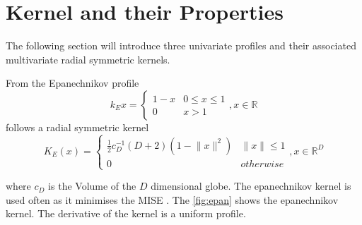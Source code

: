 \section{Kernel and their Properties} %
\label{sec:kernel_properties}
The following section will introduce three univariate profiles and
their associated multivariate radial symmetric kernels.

From the Epanechnikov profile
\begin{equation}\label{eq:epa}
  k_E{x} = \begin{cases}
    1 - x &  0 \leq x \leq 1\\
    0 & x > 1
  \end{cases}, x \in \mathbb{R}
\end{equation}
follows a radial symmetric kernel
\begin{equation}\label{eq:epak}
  K_E(x) = \begin{cases}
    \frac{1}{2}c_D^{-1}(D+2)(1-\lVert x \rVert^2) &  \lVert x \rVert \leq 1 \\
    0 & \mathit{otherwise}
  \end{cases}, x \in \mathbb{R}^D
\end{equation}

where $c_D$ is the Volume of the $D$ dimensional globe. The
epanechnikov kernel is used often as it minimises the \gls{MISE}
\citep{citeulike:5813637}. The \autoref{fig:epan} shows the
epanechnikov kernel. The derivative of the kernel is a uniform profile.



